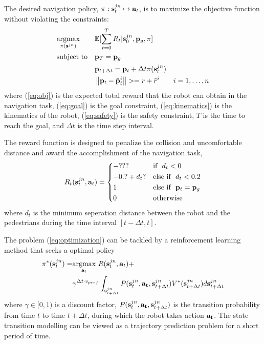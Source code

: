 \documentclass[letterpaper, 10 pt, conference]{ieeeconf}  %
\begin{document}
The desired navigation policy, $\pi : \bold{s}_t^{jn} \mapsto \bold{a}_t$, is to maximize the objective function without violating the constraints:
\begin{subequations} \label{eq:optimization}
\begin{align}
& \underset{\pi(\bold{s}^{jn})}{\text{argmax}}
& & \mathbb{E}[\sum_{t=0}^T R_t | \bold{s}_0^{jn}, \bold{p}_g, \pi] \label{eq:obj} \\
& \text{subject to} 
& & \bold{p}_T = \bold{p}_g \label{eq:goal} \\
&&& \bold{p}_{t+\Delta t} = \bold{p}_{t} + \Delta t \pi(\bold{s}_{t}^{jn}) \\
&&& \left\Vert \bold{p}_t - \tilde{\bold{p}}_t^i \right\Vert >= r + \tilde{r}^i & i = 1, \dots, n \label{eq:safety}
\end{align}
\end{subequations}
where (\ref{eq:obj}) is the expected total reward that the robot can obtain in the navigation task, (\ref{eq:goal}) is the goal constraint, (\ref{eq:kinematics}) is the kinematics of the robot, (\ref{eq:safety}) is the safety constraint, $T$ is the time to reach the goal, and $\Delta t$ is the time step interval. 

The reward function is designed to penalize the collision and uncomfortable distance and award the accomplishment of the navigation task, 
\begin{equation}
    R_t(\bold{s}_t^{jn},\bold{a}_t)= 
\begin{dcases}
    -??? & \text{if} ~~ d_t < 0 \\
    -0.? + d_t? & \text{else if} ~~ d_t < 0.2 \\
    1 & \text{else if} ~~ \bold{p}_t=\bold{p}_g \\
    0 & \text{otherwise} 
\end{dcases}
\end{equation}
where $d_t$ is the minimum seperation distance between the robot and the pedestrians during the time interval $[t-\Delta t,t]$. 

The problem (\ref{eq:optimization}) can be tackled by a reinforcement learning method that seeks a optimal policy 
\begin{equation} \label{eq:RL}
\begin{split}
\pi^{*}(\bold{s}_t^{jn}) = & \underset{\bold{a}_t}{\text{argmax}} ~ R(\bold{s}_t^{jn},\bold{a}_t) + \\
& \gamma^{\Delta t \cdot v_{pref}} \int_{\bold{s}_{t+\Delta t}^{jn}} P(\bold{s}_t^{jn},\bold{a_t},\bold{s}_{t+\Delta t}^{jn}) V^*(\bold{s}_{t+\Delta t}^{jn}) d\bold{s}_{t+\Delta t}^{jn}
\end{split}
\end{equation}
where $\gamma \in [0,1)$ is a discount factor, $P(\bold{s}_t^{jn},\bold{a_t},\bold{s}_{t+\Delta t}^{jn}) $ is the transition probability from time $t$ to time $t+\Delta t$, during which the robot takes action $\bold{a_t}$. The state transition modelling can be viewed as a trajectory prediction problem for a short period of time. 
\end{document}
